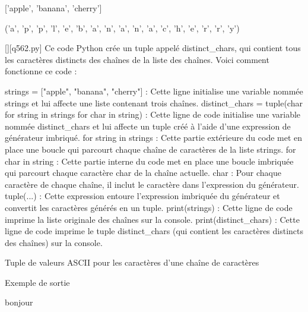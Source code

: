 ['apple', 'banana', 'cherry']

('a', 'p', 'p', 'l', 'e', 'b', 'a', 'n', 'a', 'n', 'a', 'c', 'h', 'e', 'r', 'r', 'y')
        \par
        \begin{solution}
            \renewcommand{\nomfichier}{q562.py}
            \pythonfile{\chemincode \nomfichier}[][\nomfichier]
            Ce code Python crée un tuple appelé distinct_chars, qui contient tous les caractères distincts des chaînes de la liste des chaînes. Voici comment fonctionne ce code :

    strings = ["apple", "banana", "cherry"] : Cette ligne initialise une variable nommée strings et lui affecte une liste contenant trois chaînes.
    distinct_chars = tuple(char for string in strings for char in string) : Cette ligne de code initialise une variable nommée distinct_chars et lui affecte un tuple créé à l'aide d'une expression de générateur imbriqué.
        for string in strings : Cette partie extérieure du code met en place une boucle qui parcourt chaque chaîne de caractères de la liste strings.
        for char in string : Cette partie interne du code met en place une boucle imbriquée qui parcourt chaque caractère char de la chaîne actuelle.
        char : Pour chaque caractère de chaque chaîne, il inclut le caractère dans l'expression du générateur.
        tuple(...) : Cette expression entoure l'expression imbriquée du générateur et convertit les caractères générés en un tuple.
    print(strings) : Cette ligne de code imprime la liste originale des chaînes sur la console.
    print(distinct_chars) : Cette ligne de code imprime le tuple distinct_chars (qui contient les caractères distincts des chaînes) sur la console.
        \end{solution}
        

        \question
        Tuple de valeurs ASCII pour les caractères d'une chaîne de caractères

Exemple de sortie

bonjour

